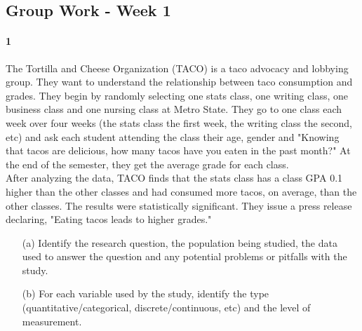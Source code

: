 \documentclass{article}
\begin{document}
\begin{flushleft}
\section*{Group Work - Week 1}
\paragraph{1} The Tortilla and Cheese Organization (TACO) is a taco advocacy and lobbying group. They want to understand the relationship between taco consumption and grades. They begin by randomly selecting one stats class, one writing class, one business class and one nursing class at Metro State. They go to one class each week over four weeks (the stats class the first week, the writing class the second, etc) and ask each student attending the class their age, gender and "Knowing that tacos are delicious, how many tacos have you eaten in the past month?" At the end of the semester, they get the average grade for each class.\\
\medskip
After analyzing the data, TACO finds that the stats class has a class GPA 0.1 higher than the other classes and had consumed more tacos, on average, than the other classes. The results were statistically significant. They issue a press release declaring, "Eating tacos leads to higher grades."

\begin{itemize}
\item [(a)] Identify the research question, the population being studied, the data used to answer the question and any potential problems or pitfalls with the study.
\vspace{2.5in}
\item[(b)] For each variable used by the study, identify the type (quantitative/categorical, discrete/continuous, etc) and the level of measurement.
\end{itemize}


\newpage

\end{flushleft}
\end{document}
